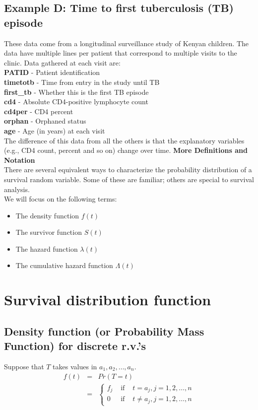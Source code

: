 \documentclass[11pt,slidesonly,semrot,portrait,palatino]{book}
\begin{document}
\subsection{Example D: Time to first tuberculosis (TB) episode}
These data come from a longitudinal surveillance study of Kenyan children.  The data have
multiple lines per patient that correspond to multiple visits to the clinic.
Data gathered at each visit are:\\[2ex]
{\bf PATID} - Patient identification\\
{\bf timetotb} - Time from entry in the study until TB\\
{\bf first\_tb} - Whether this is the first TB episode\\
{\bf cd4} - Absolute CD4-positive lymphocyte count\\
{\bf cd4per} - CD4 percent\\
{\bf orphan} - Orphaned status\\
{\bf age} - Age (in years) at each visit\\[2ex]
The difference of this data from all the others is that the explanatory variables (e.g., CD4 count,
percent and so on) change over time.
{\bf More Definitions and Notation}\\[2ex]
There are several equivalent ways to characterize the
probability distribution of a survival random variable.
Some of these are familiar; others are special to survival
analysis.\\[2ex]
We will focus on the following terms:

\begin{itemize}
\item The density function $f(t)$
\item The survivor function $S(t)$
\item The hazard function $\lambda(t)$
\item The cumulative hazard function $\Lambda(t)$
\end{itemize}
\section{Survival distribution function}
\subsection{Density function (or Probability Mass Function) for
discrete r.v.'s}
Suppose that $T$ takes values in $a_1,a_2, \ldots, a_n$.
\begin{eqnarray*}
 f(t) & = &  Pr(T = t) \\[2ex]
 & = & \left\{ \begin{array}{ccc}
 f_j & \mbox{ if } & t=a_j, j=1,2,\ldots,n \\
 0 & \mbox{ if } & t\ne a_j, j=1,2,\ldots,n
 \end{array}
 \right.
 \end{eqnarray*}
\end{document}
